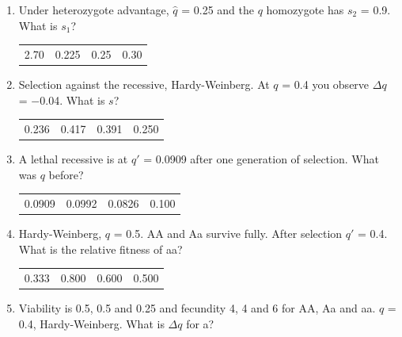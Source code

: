 \documentclass[11pt]{article}
\newcommand{\work}[1]{\par\vspace{#1}}
\begin{document}
\begin{enumerate}[label=\textbf{\arabic*.}, leftmargin=2em, itemsep=1.4em]
\item Under heterozygote advantage, \(\hat{q}\) = 0.25 and the \(q\) homozygote has \(s_2\) = 0.9. What is \(s_1\)?
\par\smallskip\noindent\begin{tabularx}{\linewidth}{@{}YYYY@{}}
2.70 & 0.225 & 0.25 & 0.30 \\
\end{tabularx}
\work{1.6cm}
\item Selection against the recessive, Hardy-Weinberg. At \(q\) = 0.4 you observe \(\Delta q\) = \(-\)0.04. What is \(s\)?
\par\smallskip\noindent\begin{tabularx}{\linewidth}{@{}YYYY@{}}
0.236 & 0.417 & 0.391 & 0.250 \\
\end{tabularx}
\work{1.6cm}
\item A lethal recessive is at \(q'\) = 0.0909 after one generation of selection. What was \(q\) before?
\par\smallskip\noindent\begin{tabularx}{\linewidth}{@{}YYYY@{}}
0.0909 & 0.0992 & 0.0826 & 0.100 \\
\end{tabularx}
\work{1.6cm}
\item Hardy-Weinberg, \(q\) = 0.5. AA and Aa survive fully. After selection \(q'\) = 0.4. What is the relative fitness of aa?
\par\smallskip\noindent\begin{tabularx}{\linewidth}{@{}YYYY@{}}
0.333 & 0.800 & 0.600 & 0.500 \\
\end{tabularx}
\work{1.6cm}
\item Viability is 0.5, 0.5 and 0.25 and fecundity 4, 4 and 6 for AA, Aa and aa. \(q\) = 0.4, Hardy-Weinberg. What is \(\Delta q\) for a?
\par\smallskip\noindent\begin{tabularx}{\linewidth}{@{}YYYY@{}}

\end{tabularx}
\end{enumerate}
\end{document}
